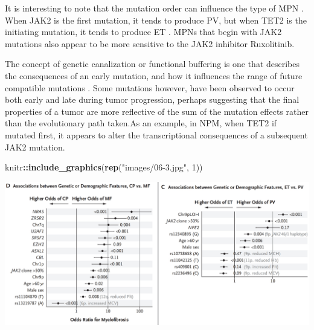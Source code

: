 \documentclass[]{book}
\newenvironment{Shaded}{\begin{snugshade}}{\end{snugshade}}
\newcommand{\KeywordTok}[1]{\textcolor[rgb]{0.13,0.29,0.53}{\textbf{#1}}}
\newcommand{\DataTypeTok}[1]{\textcolor[rgb]{0.13,0.29,0.53}{#1}}
\newcommand{\DecValTok}[1]{\textcolor[rgb]{0.00,0.00,0.81}{#1}}
\newcommand{\StringTok}[1]{\textcolor[rgb]{0.31,0.60,0.02}{#1}}
\newcommand{\OtherTok}[1]{\textcolor[rgb]{0.56,0.35,0.01}{#1}}
\newcommand{\OperatorTok}[1]{\textcolor[rgb]{0.81,0.36,0.00}{\textbf{#1}}}
\newcommand{\NormalTok}[1]{#1}
\begin{document}
\begin{Shaded}
\end{Shaded}

\citep{grinfeld2018classification}

It is interesting to note that the mutation order can influence the type
of MPN \citep{ortmann2015effect, nangalia2015dnmt3a}. When JAK2 is the
first mutation, it tends to produce PV, but when TET2 is the initiating
mutation, it tends to produce ET \citep{ortmann2015effect}. MPNs that
begin with JAK2 mutations also appear to be more sensitive to the JAK2
inhibitor Ruxolitinib.

The concept of genetic canalization or functional buffering is one that
describes the consequences of an early mutation, and how it influences
the range of future compatible mutations
\citep{ashworth2011genetic, hartman2001principles}. Some mutations
however, have been observed to occur both early and late during tumor
progression, perhaps suggesting that the final properties of a tumor are
more reflective of the sum of the mutation effects rather than the
evolutionary path taken.As an example, in NPM, when TET2 if mutated
first, it appears to alter the transcriptional consequences of a
subsequent JAK2 mutation.

\begin{Shaded}
\begin{Highlighting}[]
\NormalTok{knitr}\OperatorTok{::}\KeywordTok{include_graphics}\NormalTok{(}\KeywordTok{rep}\NormalTok{(}\StringTok{"images/06-3.jpg"}\NormalTok{, }\DecValTok{1}\NormalTok{))          }
\end{Highlighting}
\end{Shaded}

\includegraphics{images/06-3.jpg}
\end{document}
